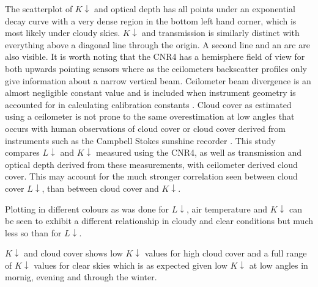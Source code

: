 \documentclass[a4paper,titlepage, twoside]{report}
\newcommand\Kdown{K\!\!\downarrow}
\newcommand\Ldown{L\!\!\downarrow}
\begin{document}
The scatterplot of $\Kdown$ and optical depth has all points under an exponential decay curve with a very dense region in the bottom left hand corner, which is most likely under cloudy skies. $\Kdown$ and transmission is similarly distinct with everything above a diagonal line through the origin. A second line and an arc are also visible. It is worth noting that the CNR4 has a hemisphere field of view for both upwards pointing sensors where as the ceilometers backscatter profiles only give information about a narrow vertical beam. Ceilometer beam divergence is an almost negligible constant value and is included when instrument geometry is accounted for in calculating calibration constants \parencite{vaisala2}.  Cloud cover as estimated using a ceilometer is not prone to the same overestimation at low angles that occurs with human observations of cloud cover or cloud cover derived from instruments such as the Campbell Stokes sunshine recorder \parencite{monteith}. This study compares $\Ldown$ and $\Kdown$ measured using the CNR4, as  well as transmission and optical depth derived from these measurements, with ceilometer derived cloud cover. This may account for the much stronger correlation seen between cloud cover $\Ldown$, than between cloud cover and $\Kdown$.

Plotting in different colours as was done for $\Ldown$, air temperature and $\Kdown$ can be seen to exhibit a different relationship in cloudy and clear conditions but much less so than for $\Ldown$.

$\Kdown$ and cloud cover shows low $\Kdown$ values for high cloud cover and a full range of $\Kdown$ values for clear skies which is as expected given low $\Kdown$ at low angles in mornig, evening and through the winter.
\end{document}
